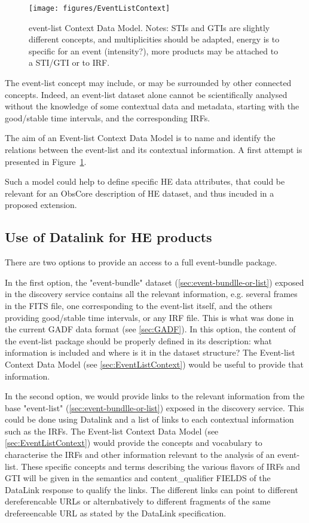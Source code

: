 \documentclass[11pt,a4paper]{ivoa}
\begin{document}
{\begin{figure}
\centering
\texttt{[image: figures/EventListContext]}
\caption{event-list Context Data Model. Notes: STIs and GTIs are slightly different concepts, and multiplicities should be adapted, energy is to specific for an event (intensity?), more products may be attached to a STI/GTI or to IRF.}
\label{fig:EventListContext}
\end{figure}

The event-list concept may include, or may be surrounded by other connected concepts. Indeed, an event-list dataset alone cannot be scientifically analysed without the knowledge of some contextual data and metadata, starting with the good/stable time intervals, and the corresponding IRFs.

The aim of an Event-list Context Data Model is to name and identify the relations between the event-list and its contextual information. A first attempt is presented in Figure~\ref{fig:EventListContext}.

Such a model could help to define specific HE data attributes, that could be relevant for an ObsCore description of HE dataset, and thus incuded in a proposed extension.


\subsection{Use of Datalink for HE products}
\label{sec:datalink}

There are two options to provide an access to a full event-bundle package.

In the first option, the "event-bundle" dataset (\ref{sec:event-bundlle-or-list}) exposed in the discovery service  contains all the relevant information, e.g. several frames in the FITS file, one corresponding to the event-list itself, and the others providing good/stable time intervals, or any IRF file. This is what was done in the current GADF data format (see \ref{sec:GADF}). In this option, the content of the event-list package should be properly defined in its description: what information is included and where is it in the dataset structure? The Event-list Context Data Model (see \ref{sec:EventListContext}) would be useful to provide that information.

In the second option, we would provide links to the relevant information from the base "event-list" (\ref{sec:event-bundlle-or-list}) exposed in the discovery service. This could be done using Datalink and a list of links to each contextual information such as the IRFs. The Event-list Context Data Model (see \ref{sec:EventListContext}) would provide the concepts and vocabulary to characterise the IRFs and other information relevant to the analysis of an event-list. These specific concepts and terms describing the various flavors of IRFs and GTI will be given in the semantics and content\_qualifier FIELDS of the DataLink response to qualify the links. The different links can point to different
dereferencable URLs or alternbatively to different fragments of the same drefereencable URL as stated by the DataLink specification.


}
\end{document}

